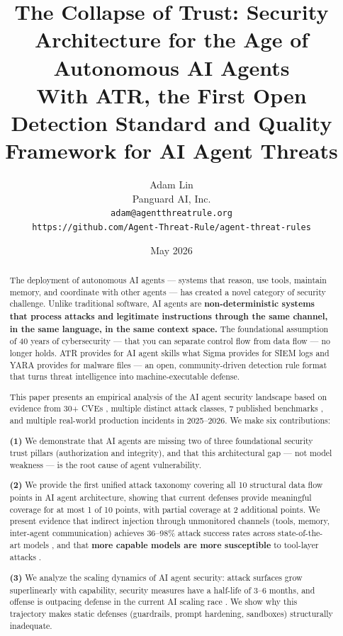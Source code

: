 \documentclass[11pt,letterpaper]{article}
\title{The Collapse of Trust: Security Architecture for the Age of Autonomous AI Agents\\[0.5em]
\large With ATR, the First Open Detection Standard and Quality Framework for AI Agent Threats}
\author{Adam Lin\\
Panguard AI, Inc.\\
\texttt{adam@agentthreatrule.org}\\
\texttt{https://github.com/Agent-Threat-Rule/agent-threat-rules}}
\date{May 2026}
\begin{document}
\maketitle

\begin{abstract}
The deployment of autonomous AI agents --- systems that reason, use tools, maintain memory, and coordinate with other agents --- has created a novel category of security challenge. Unlike traditional software, AI agents are \textbf{non-deterministic systems that process attacks and legitimate instructions through the same channel, in the same language, in the same context space.} The foundational assumption of 40 years of cybersecurity --- that you can separate control flow from data flow --- no longer holds. ATR provides for AI agent skills what Sigma provides for SIEM logs and YARA provides for malware files --- an open, community-driven detection rule format that turns threat intelligence into machine-executable defense.

This paper presents an empirical analysis of the AI agent security landscape based on evidence from 30+ CVEs \cite{cve6514,cve53773,cvegit,cve49596,cve59536,postmark,sandworm}, multiple distinct attack classes, 7 published benchmarks \cite{pint,mcptox,asb,aishell,hacka,tensortrust,caibench}, and multiple real-world production incidents in 2025--2026. We make six contributions:

\textbf{(1)} We demonstrate that AI agents are missing two of three foundational security trust pillars (authorization and integrity), and that this architectural gap --- not model weakness --- is the root cause of agent vulnerability.

\textbf{(2)} We provide the first unified attack taxonomy covering all 10 structural data flow points in AI agent architecture, showing that current defenses provide meaningful coverage for at most 1 of 10 points, with partial coverage at 2 additional points. We present evidence that indirect injection through unmonitored channels (tools, memory, inter-agent communication) achieves 36--98\% attack success rates across state-of-the-art models \cite{mcptox,minja,asb}, and that \textbf{more capable models are more susceptible} to tool-layer attacks \cite{mcptoxbench}.

\textbf{(3)} We analyze the scaling dynamics of AI agent security: attack surfaces grow superlinearly with capability, security measures have a half-life of 3--6 months, and offense is outpacing defense in the current AI scaling race \cite{aisafety}. We show why this trajectory makes static defenses (guardrails, prompt hardening, sandboxes) structurally inadequate.


\end{abstract}
\end{document}
